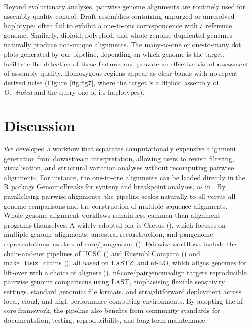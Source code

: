 \documentclass[PCJ,Unicode,screen]{cedram}
\begin{document}
Beyond evolutionary analyses, pairwise genome alignments are routinely used for assembly quality control. Draft assemblies containing unpurged or unresolved haplotypes often fail to exhibit a one-to-one correspondence with a reference genome. Similarly, diploid, polyploid, and whole-genome-duplicated genomes naturally produce non-unique alignments. The many-to-one or one-to-many dot plots generated by our pipeline, depending on which genome is the target, facilitate the detection of these features and provide an effective visual assessment of assembly quality. Homozygous regions appear as clear bands with no repeat-derived noise (Figure~\ref{fig:fig7}, where the target is a diploid assembly of \emph{O.~dioica} and the query one of its haplotypes).

\section*{Discussion}

We developed a workflow that separates computationally expensive alignment generation from downstream interpretation, allowing users to revisit filtering, visualisation, and structural variation analyses without recomputing pairwise alignments. For instance, the one-to-one alignments can be loaded directly in the R package GenomicBreaks for synteny and breakpoint analyses, as in \citet{Plessy_2024}. By parallelising pairwise alignments, the pipeline scales naturally to all-versus-all genome comparisons and the construction of multiple sequence alignments. Whole-genome alignment workflows remain less common than alignment programs themselves. A widely adopted one is Cactus (\cite{Armstrong_2020}), which focuses on multiple-genome alignments, ancestral reconstruction, and pangenome representations, as does nf-core/pangenome (\cite{Heumos_2024}). Pairwise workflows include the chain-and-net pipelines of UCSC (\cite{Kent_2003}) and Ensembl Compara (\cite{Herrero_2016}) and make\_lastz\_chains (\cite{Kirilenko_2023}), all based on LASTZ, and nf-LO, which aligns genomes for lift-over with a choice of aligners (\cite{Talenti_2021}). nf-core/pairgenomealign targets reproducible pairwise genome comparisons using LAST, emphasising flexible sensitivity settings, standard genomics file formats, and straightforward deployment across local, cloud, and high-performance computing environments. By adopting the nf-core framework, the pipeline also benefits from community standards for documentation, testing, reproducibility, and long-term maintenance.
\end{document}
